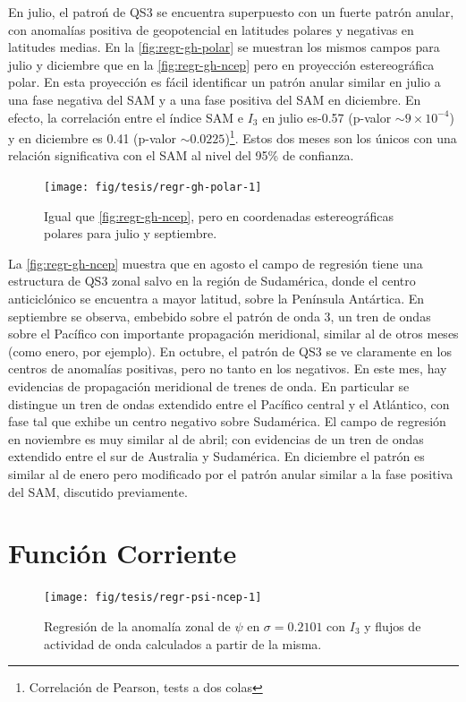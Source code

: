 \documentclass[spanish,a4paper,12pt,oneside]{book}
\let\rmarkdownfootnote\footnote%
\def\footnote{\protect\rmarkdownfootnote}
\begin{document}
En julio, el patroń de QS3 se encuentra superpuesto con un fuerte patrón
anular, con anomalías positiva de geopotencial en latitudes polares y
negativas en latitudes medias. En la \autoref{fig:regr-gh-polar} se
muestran los mismos campos para julio y diciembre que en la
\autoref{fig:regr-gh-ncep} pero en proyección estereográfica polar. En
esta proyección es fácil identificar un patrón anular similar en julio a
una fase negativa del SAM y a una fase positiva del SAM en diciembre. En
efecto, la correlación entre el índice SAM e \(I_3\) en julio es-0.57
(p-valor \(\sim 9\times 10^{-4}\)) y en diciembre es 0.41 (p-valor
\(\sim 0.0225\))\footnote{Correlación de Pearson, tests a dos colas}.
Estos dos meses son los únicos con una relación significativa con el SAM
al nivel del 95\% de confianza.

\begin{figure}
\texttt{[image: fig/tesis/regr-gh-polar-1]} \caption{Igual que \autoref{fig:regr-gh-ncep}, pero en coordenadas estereográficas polares para julio y septiembre.}\label{fig:regr-gh-polar}
\end{figure}

La \autoref{fig:regr-gh-ncep} muestra que en agosto el campo de
regresión tiene una estructura de QS3 zonal salvo en la región de
Sudamérica, donde el centro anticiclónico se encuentra a mayor latitud,
sobre la Península Antártica. En septiembre se observa, embebido sobre
el patrón de onda 3, un tren de ondas sobre el Pacífico con importante
propagación meridional, similar al de otros meses (como enero, por
ejemplo). En octubre, el patrón de QS3 se ve claramente en los centros
de anomalías positivas, pero no tanto en los negativos. En este mes, hay
evidencias de propagación meridional de trenes de onda. En particular se
distingue un tren de ondas extendido entre el Pacífico central y el
Atlántico, con fase tal que exhibe un centro negativo sobre Sudamérica.
El campo de regresión en noviembre es muy similar al de abril; con
evidencias de un tren de ondas extendido entre el sur de Australia y
Sudamérica. En diciembre el patrón es similar al de enero pero
modificado por el patrón anular similar a la fase positiva del SAM,
discutido previamente.

\section*{Función Corriente}

\begin{landscape}\begin{figure}

{\centering \texttt{[image: fig/tesis/regr-psi-ncep-1]} 

}

\caption{Regresión de la anomalía zonal de $\psi$ en $\sigma = 0.2101$ con $I_3$ y flujos de actividad de onda calculados a partir de la misma.}\label{fig:regr-psi-ncep}
\end{figure}
\end{landscape}
\end{document}
